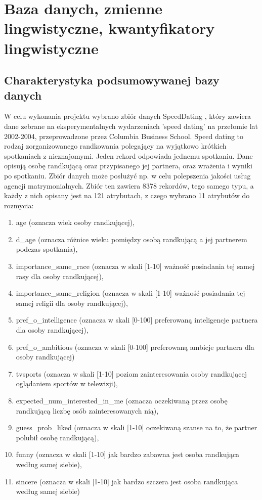 \documentclass{classrep}
\begin{document}
\section{Baza danych, zmienne lingwistyczne, kwantyfikatory lingwistyczne}

\subsection{Charakterystyka podsumowywanej bazy danych}

W celu wykonania projektu wybrano zbiór danych SpeedDating \cite{database}, który zawiera dane zebrane na eksperymentalnych wydarzeniach 'speed dating' na przełomie lat 2002-2004, przeprowadzone przez Columbia Business School. 
Speed dating to rodzaj zorganizowanego randkowania polegający na wyjątkowo krótkich spotkaniach z nieznajomymi. Jeden rekord odpowiada jednemu spotkaniu. Dane opisują osobę randkującą oraz przypisanego jej partnera, oraz wrażenia i wyniki po spotkaniu. 
Zbiór danych może posłużyć np. w celu polepszenia jakości usług agencji matrymonialnych.
Zbiór ten zawiera 8378 rekordów, tego samego typu, a każdy z nich opisany jest na 121 atrybutach, z czego wybrano 11 atrybutów do rozmycia:
\begin{enumerate}
  \item age (oznacza wiek osoby randkującej),
  \item d\_age (oznacza różnice wieku pomiędzy osobą randkującą a jej partnerem podczas spotkania),
  \item importance\_same\_race (oznacza w skali [1-10] ważność posiadania tej samej rasy dla osoby randkującej), 
  \item importance\_same\_religion (oznacza w skali [1-10] ważność posiadania tej samej religii dla osoby randkującej), 
  \item pref\_o\_intelligence (oznacza w skali [0-100] preferowaną inteligencje partnera dla osoby randkującej),
  \item pref\_o\_ambitious (oznacza w skali [0-100] preferowaną ambicje partnera dla osoby randkującej)
  \item tvsports (oznacza w skali [1-10] poziom zainteresowania osoby randkującej oglądaniem sportów w telewizji),
  \item expected\_num\_interested\_in\_me (oznacza oczekiwaną przez osobę randkującą liczbę osób zainteresowanych nią),
  \item guess\_prob\_liked (oznacza w skali [1-10] oczekiwaną szanse na to, że partner polubił osobę randkującą),
  \item funny (oznacza w skali [1-10] jak bardzo zabawna jest osoba randkująca według samej siebie),
  \item sincere (oznacza w skali [1-10] jak bardzo szczera jest osoba randkująca według samej siebie)
\end{enumerate}
\end{document}
